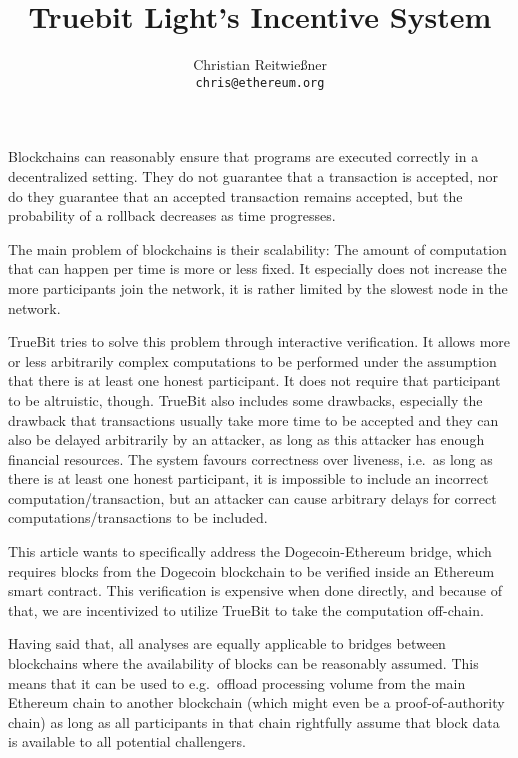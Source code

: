\documentclass[11pt,letterpaper]{article}
\date{}
\begin{document}


\title{Truebit Light's Incentive System}

\author{Christian Reitwießner \\ 
{\tt chris@ethereum.org}}


\maketitle



Blockchains can reasonably ensure that programs are executed correctly in a decentralized setting.
They do not guarantee that a transaction is accepted, nor do they guarantee that an accepted transaction remains
accepted, but the probability of a rollback decreases as time progresses.

The main problem of blockchains is their scalability: The amount of computation that can happen per time is more or less fixed.
It especially does not increase the more participants join the network, it is rather limited by the slowest node in the
network.

TrueBit tries to solve this problem through interactive verification. It allows more or less arbitrarily complex computations to
be performed under the assumption that there is at least one honest participant. It does not require that participant
to be altruistic, though. TrueBit also includes some drawbacks, especially the drawback that transactions usually take
more time to be accepted and they can also be delayed arbitrarily by an attacker, as long as this attacker has enough
financial resources. The system favours correctness over liveness, i.e.\ as long as there is at least one honest
participant, it is impossible to include an incorrect computation/transaction, but an attacker can cause arbitrary delays for
correct computations/transactions to be included.

This article wants to specifically address the Dogecoin-Ethereum bridge, which requires blocks from the Dogecoin
blockchain to be verified inside an Ethereum smart contract. This verification is expensive when done directly,
and because of that, we are incentivized to utilize TrueBit to take the computation off-chain.

Having said that, all analyses are equally applicable to bridges between blockchains where the availability of blocks
can be reasonably assumed. This means that it can be used to e.g.\ offload processing volume from the main Ethereum
chain to another blockchain (which might even be a proof-of-authority chain) as long as all participants in that chain
rightfully assume that block data is available to all potential challengers.
\end{document}
